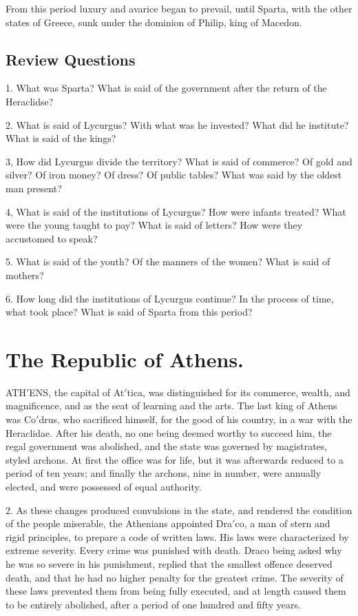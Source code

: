 \documentclass[openany,a4paper]{memoir}
\begin{document}
From this period luxury and avarice began to prevail, 
until Sparta, with the other states of Greece, sunk under the 
dominion of Philip, king of Macedon. 


\section{Review Questions}


1. What was Sparta? What is said of the government after the return of the Heraclidse?  

2. What is said of Lycurgus? 
With what was he invested? What did he institute? What is said of the 
kings?  

3, How did Lycurgus divide the territory? What is said of commerce? Of gold and silver? Of iron money? Of dress? Of public tables? 
What was said by the oldest man present?  

4, What is said of the 
institutions of Lycurgus? How were infants treated? What were the 
young taught to pay? What is said of letters? How were they accustomed to speak?

5. What is said of the youth? Of the manners of 
the women? What is said of mothers? 

6. How long did the institutions of Lycurgus continue? In the process of time, what took place? What is said of Sparta from this period? 



\chapter{The Republic of Athens.}

ATH$'$ENS, the capital of At$'$tica, was distinguished for 
its commerce, wealth, and magnificence, and as the seat 
of learning and the arts. The last king of Athens was Co$'$drus, who sacrificed himself, for the good of his country, in 
a war with the Heraclidae. After his death, no one being deemed worthy to succeed him, the regal government was 
abolished, and the state was governed by magistrates, styled 
archons. At first the office was for life, but it was afterwards reduced to a period of ten years; and finally the 
archons, nine in number, were annually elected, and were 
possessed of equal authority. 

2. As these changes produced convulsions in the state, 
and rendered the condition of the people miserable, the 
Athenians appointed Dra$'$co, a man of stern and rigid principles, to prepare a code of written laws. His laws were 
characterized by extreme severity. Every crime was punished with death. Draco being asked why he was so severe 
in his punishment, replied that the smallest offence deserved 
death, and that he had no higher penalty for the greatest 
crime. The severity of these laws prevented them from 
being fully executed, and at length caused them to be 
entirely abolished, after a period of one hundred and fifty 
years. 
\end{document}
